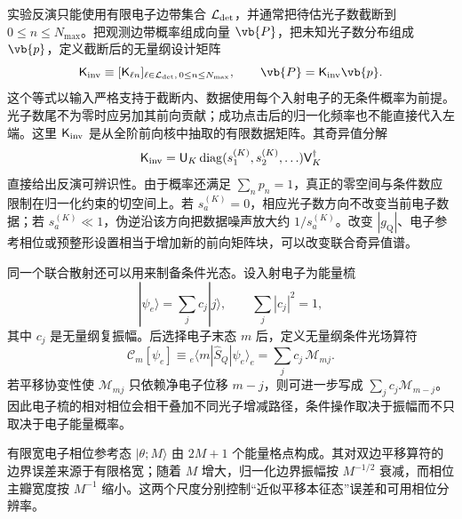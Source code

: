 \begin{exbox}[光子统计反演与电子后选择条件操作]
实验反演只能使用有限电子边带集合 $\mathcal L_{\rm det}$，并通常把待估光子数截断到 $0\le n\le N_{\max}$。把观测边带概率组成向量 $\vb{P}$，把未知光子数分布组成 $\vb{p}$，定义截断后的无量纲设计矩阵
\begin{equation}
{
\mathsf K_{\rm inv}
\equiv[\mathsf K_{\ell n}]_{\ell\in\mathcal L_{\rm det},\,0\le n\le N_{\max}},
\qquad
\vb{P}=\mathsf K_{\rm inv}\vb{p}.}
\label{eq:single_mode_kernel_inverse_problem_dp68}
\end{equation}
这个等式以输入严格支持于截断内、数据使用每个入射电子的无条件概率为前提。光子数尾不为零时应另加其前向贡献；成功点击后的归一化频率也不能直接代入左端。这里 $\mathsf K_{\rm inv}$ 是从全阶前向核中抽取的有限数据矩阵。其奇异值分解
\begin{equation}
{
\mathsf K_{\rm inv}
=\mathsf U_K\operatorname{diag}(s_1^{(K)},s_2^{(K)},\ldots)\mathsf V_K^\dagger}
\label{eq:single_mode_kernel_svd}
\end{equation}
直接给出反演可辨识性。由于概率还满足 $\sum_n p_n=1$，真正的零空间与条件数应限制在归一化约束的切空间上。若 $s_a^{(K)}=0$，相应光子数方向不改变当前电子数据；若 $s_a^{(K)}\ll1$，伪逆沿该方向把数据噪声放大约 $1/s_a^{(K)}$。改变 $|g_{\mathrm Q}|$、电子参考相位或预整形设置相当于增加新的前向矩阵块，可以改变联合奇异值谱。

同一个联合散射还可以用来制备条件光态。设入射电子为能量梳
\begin{equation*}
|\psi_e\rangle
=\sum_j c_j|j\rangle,
\qquad
\sum_j|c_j|^2=1,
\end{equation*}
其中 $c_j$ 是无量纲复振幅。后选择电子末态 $m$ 后，定义无量纲条件光场算符
\begin{equation}
{
\mathscr C_m[\psi_e]
\equiv{}_e\!\langle m|\hat S_Q|\psi_e\rangle_e
=\sum_j c_j\,\mathscr M_{mj}.}
\label{eq:comb_conditioned_kraus-dp19}
\end{equation}
若平移协变性使 $\mathscr M_{mj}$ 只依赖净电子位移 $m-j$，则可进一步写成 $\sum_jc_j\mathscr M_{m-j}$。因此电子梳的相对相位会相干叠加不同光子增减路径，条件操作取决于振幅而不只取决于电子能量概率。

有限宽电子相位参考态 $|\theta;M\rangle$ 由 $2M+1$ 个能量格点构成。其对双边平移算符的边界误差来源于有限格宽；随着 $M$ 增大，归一化边界振幅按 $M^{-1/2}$ 衰减，而相位主瓣宽度按 $M^{-1}$ 缩小。这两个尺度分别控制“近似平移本征态”误差和可用相位分辨率。

\medskip


\end{exbox}

